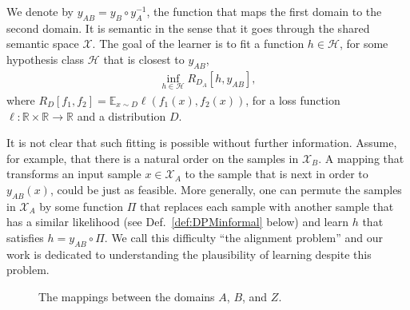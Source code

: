 \documentclass{article} %
\begin{document}
We denote by $y_{AB} = y_B \circ y^{-1}_A$, the function that maps the first domain to the second domain. It is semantic in the sense that it goes through the shared semantic space $\mathcal X$. The goal of the learner is to fit a function $h\in \mathcal{H}$, for some hypothesis class $\mathcal{H}$ that is closest to $y_{AB}$,
\begin{equation}
\label{eq:32}
\begin{aligned}
\inf_{h\in \mathcal{H}} R_{D_A}[h,y_{AB}],
\end{aligned}
\end{equation} 
where $R_D[f_1,f_2] = \mathbb{E}_{x \sim D} \ell (f_1(x),f_2(x))$, for a loss function $\ell: \mathbb{R} \times \mathbb{R} \rightarrow \mathbb{R}$ and a distribution $D$.

It is not clear that such fitting is possible without further information. Assume, for example, that there is a natural order on the samples in $\mathcal X_B$. A mapping that transforms an input sample $x \in \mathcal X_A$ to the sample that is next in order to $y_{AB}(x)$, could be just as feasible. More generally, one can permute the samples in $\mathcal X_A$ by some function $\Pi$ that replaces each sample with another sample that has a similar likelihood (see Def.~\ref{def:DPMinformal} below) and learn $h$ that satisfies $h = y_{AB}\circ \Pi$. We call this difficulty ``the alignment problem'' and our work is dedicated to understanding the plausibility of learning despite this problem.

{

\begin{figure}[t]
\centering
{}
\caption{The mappings between the domains $A$, $B$, and $Z$.} \label{fig:AZB}
\end{figure}
} 
\end{document}
